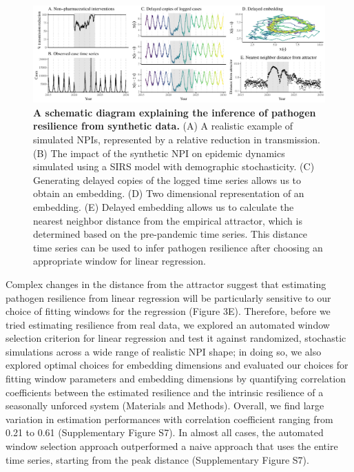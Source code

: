 \documentclass[12pt]{article}
\begin{document}
\begin{figure}[!ht]
\includegraphics[width=\textwidth]{../figure3/figure3.pdf}
\caption{
\textbf{A schematic diagram explaining the inference of pathogen resilience from synthetic data.}
(A) A realistic example of simulated NPIs, represented by a relative reduction in transmission.
(B) The impact of the synthetic NPI on epidemic dynamics simulated using a SIRS model with demographic stochasticity.
(C) Generating delayed copies of the logged time series allows us to obtain an embedding.
(D) Two dimensional representation of an embedding.
(E) Delayed embedding allows us to calculate the nearest neighbor distance from the empirical attractor, which is determined based on the pre-pandemic time series.
This distance time series can be used to infer pathogen resilience after choosing an appropriate window for linear regression.
}
\end{figure}

Complex changes in the distance from the attractor suggest that estimating pathogen resilience from linear regression will be particularly sensitive to our choice of fitting windows for the regression (Figure 3E).
Therefore, before we tried estimating resilience from real data, we explored an automated window selection criterion for linear regression and test it against randomized, stochastic simulations across a wide range of realistic NPI shape;
in doing so, we also explored optimal choices for embedding dimensions and evaluated our choices for fitting window parameters and embedding dimensions by quantifying correlation coefficients between the estimated resilience and the intrinsic resilience of a seasonally unforced system (Materials and Methods).
Overall, we find large variation in estimation performances with correlation coefficient ranging from 0.21 to 0.61 (Supplementary Figure S7).
In almost all cases, the automated window selection approach outperformed a naive approach that uses the entire time series, starting from the peak distance (Supplementary Figure S7).
\end{document}
